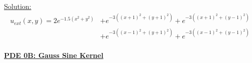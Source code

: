 \documentclass[.\jobname.tex]{subfiles}
\begin{document}
\underline{Solution: }
\begin{equation}
\label{eq:sol0A}
\begin{split}
u_{ext}(x,y) = 2e^{-1.5(x^2 + y^2)} & + e^{-3((x+1)^2 + (y+1)^2)} + e^{-3((x+1)^2 + (y-1)^2)} \\
                              & + e^{-3((x-1)^2 + (y+1)^2)} + e^{-3((x-1)^2 + (y-1)^2)} \\
\end{split}
\end{equation}


\begin{figure}[H]
	\centering
	\noindent{}
	\label{fig:sol_plot_0A}
\end{figure}





\underline{\textbf{PDE 0B: Gauss Sine Kernel}}
\end{document}
